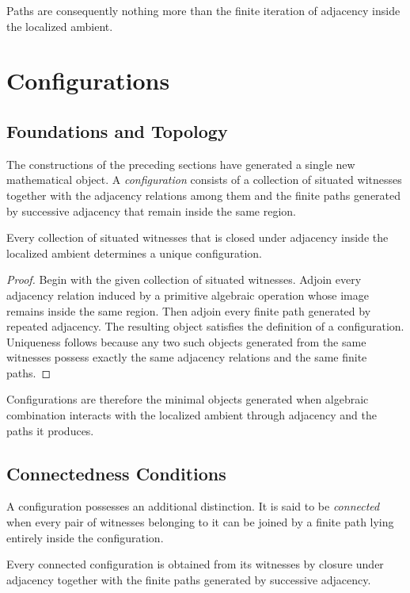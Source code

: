 \documentclass[12pt,anyside]{book}
\newcommand{\term}[1]{\textit{#1}}             %
\begin{document}
Paths are consequently nothing more than the finite iteration of adjacency inside the localized ambient.

\section{Configurations}
\subsection{Foundations and Topology}
The constructions of the preceding sections have generated a single new mathematical object. A \term{configuration} consists of a collection of situated witnesses together with the adjacency relations among them and the finite paths generated by successive adjacency that remain inside the same region.

\begin{theorem}
Every collection of situated witnesses that is closed under adjacency inside the localized ambient determines a unique configuration.
\end{theorem}

\begin{proof}
Begin with the given collection of situated witnesses. Adjoin every adjacency relation induced by a primitive algebraic operation whose image remains inside the same region. Then adjoin every finite path generated by repeated adjacency. The resulting object satisfies the definition of a configuration. Uniqueness follows because any two such objects generated from the same witnesses possess exactly the same adjacency relations and the same finite paths.
\end{proof}

Configurations are therefore the minimal objects generated when algebraic combination interacts with the localized ambient through adjacency and the paths it produces.

\subsection{Connectedness Conditions}
A configuration possesses an additional distinction. It is said to be \term{connected} when every pair of witnesses belonging to it can be joined by a finite path lying entirely inside the configuration.

\begin{theorem}
Every connected configuration is obtained from its witnesses by closure under adjacency together with the finite paths generated by successive adjacency.
\end{theorem}
\end{document}

